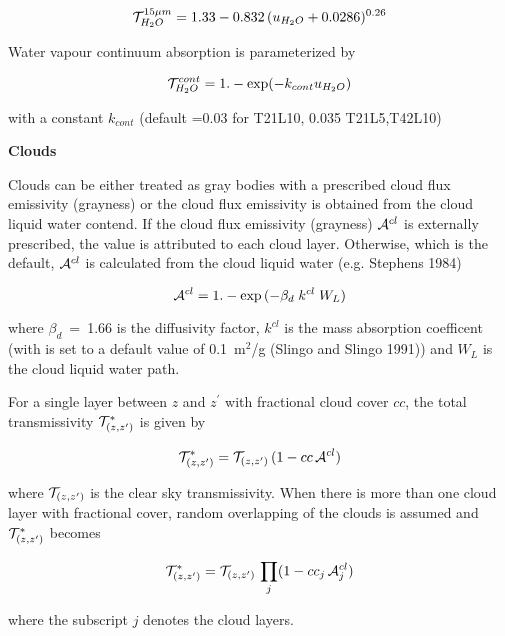\begin{equation}
{\cal T}_{H_2O}^{15\mu m}  =  1.33-0.832 \, (u_{H_2O}
+
0.0286)^{0.26} 
\end{equation}

Water vapour continuum absorption is parameterized by

\begin{equation}
{\cal T}_{H_2O}^{cont}  =  1. - \exp(-k_{cont} u_{H_2O}) 
\end{equation}

with a constant $k_{cont}$ (default =0.03 for T21L10, 0.035 T21L5,T42L10)  

{\bf  Clouds}

Clouds can be either treated as gray bodies with a prescribed cloud flux emissivity (grayness) or
the cloud flux emissivity is obtained from the cloud liquid water contend. If the cloud flux
emissivity (grayness) ${\cal A}^{cl}$  is externally prescribed, the value is 
attributed to each cloud layer. Otherwise, which is the default, ${\cal A}^{cl}$ is calculated
from the cloud liquid water (e.g. Stephens 1984)

\begin{equation}
{\cal A}^{cl}=1.-\exp{(-\beta_d \; k^{cl} \; W_L)}
\end{equation}
  
where $\beta_d$~=~1.66 is the diffusivity factor, $k^{cl}$ is the mass absorption coefficent
(with
is set to a default value of 0.1~m$^2$/g (Slingo and Slingo 1991)) and $W_L$ is the
cloud liquid water path.

For a single layer
between $z$ and $z^{\prime}$ with fractional cloud
cover
$cc$, the total transmissivity ${\cal T}^*_{(z, z^{\prime})}$
is
given by


\begin{equation}
{\cal T}^*_{(z, z^{\prime})} = {\cal T}_{(z, z^{\prime})} \, (1 -  cc \,
{\cal A}^{cl})
\end{equation}

where ${\cal T}_{(z, z^{\prime})}$ is the clear sky
transmissivity. When there is more than one cloud
layer
with fractional cover, random overlapping of the
clouds is
assumed and ${\cal T}^*_{(z, z^{\prime})}$ becomes

\begin{equation}
{\cal T}^*_{(z, z^{\prime})} ={\cal T}_{(z, z^{\prime})} \, \prod_j (1
- cc_j \, {\cal A}^{cl}_{j}) 
\end{equation}

where the subscript $j$ denotes the cloud layers.

